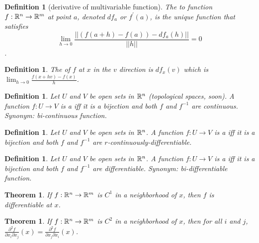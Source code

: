 \documentclass[11pt]{amsbook}
\theoremstyle{mystyle} \newtheorem{thrm}[thm]{Theorem}
\theoremstyle{mystyle} \newtheorem{defi}[thm]{Definition}
\theoremstyle{mystyle} \newtheorem{coro}[thm]{Corollary}
\theoremstyle{mystyle} \newtheorem{propo}[thm]{Proposition}
\theoremstyle{mystyle} \newtheorem{lemm}[thm]{Lemma}
\numberwithin{thm}{section}
\begin{document}
\begin{defi}[derivative of multivariable function]
	The  to function $f : {\mathbb R}^n \to {\mathbb R}^m$ at point $a$, denoted $df_a$ or $f^{\prime}(a)$, is the unique function that satisfies $$\lim_{h\to 0} \frac{||\left(f(a+h) - f(a)\right) - df_a(h)||}{||h||} = 0$$.
\end{defi}
\begin{defi}
	The  of $f$ at $x$ in the $v$ direction is $df_x(v)$ which is $\lim_{h\to 0} \frac{f(x+hv) - f(x)}{h}$.
\end{defi}
\begin{defi}
	Let $U$ and $V$ be open sets in ${\mathbb R}^n$ (topological spaces, soon).  A function $f:U\to V$ is a  iff it is a bijection and both $f$ and $f^{-1}$ are continuous.
	Synonym: bi-continuous function.
\end{defi}
\begin{defi}
	Let $U$ and $V$ be open sets in ${\mathbb R}^n$.  A function $f:U\to V$ is a  iff it is a bijection and both $f$ and $f^{-1}$ are $r$-continuously-differentiable.
\end{defi}
\begin{defi}
	Let $U$ and $V$ be open sets in ${\mathbb R}^n$.  A function $f:U\to V$ is a  iff it is a bijection and both $f$ and $f^{-1}$ are differentiable.
	Synonym: bi-differentiable function.
\end{defi}
\begin{thrm}
	If $f:{\mathbb R}^n \to {\mathbb R}^m$ is $C^1$ in a neighborhood of $x$, then $f$ is differentiable at $x$.
\end{thrm}
\begin{thrm}
	If $f:{\mathbb R}^n \to {\mathbb R}^m$ is $C^2$ in a neighborhood of $x$, then for all $i$ and $j$, $\frac{\partial^2f}{\partial x_i \partial x_j}(x) = \frac{\partial^2f}{\partial x_j \partial x_i}(x)$.
\end{thrm}
\end{document}
